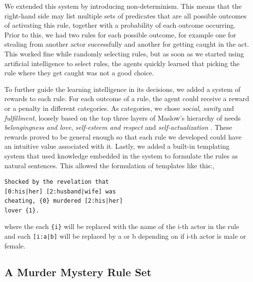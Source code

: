 We extended this system by introducing non-determinism. This means that the right-hand side may list multiple sets of predicates that are all possible outcomes of activating this rule, together with a probability of each outcome occurring. Prior to this, we had two rules for each possible outcome, for example one for stealing from another actor successfully and another for getting caught in the act. This worked fine while randomly selecting rules, but as soon as we started using artificial intelligence to select rules, the agents quickly learned that picking the rule where they get caught was not a good choice.

To further guide the learning intelligence in its decisions, we added a system of rewards to each rule. For each outcome of a rule, the agent could receive a reward or a penalty in different categories.
As categories, we chose \emph{social}, \emph{sanity} and \emph{fulfillment}, loosely based on the top three layers of Maslow's hierarchy of needs \emph{belongingness and love}, \emph{self-esteem and respect} and \emph{self-actualization} \cite{maslow_1943}.
These rewards proved to be general enough so that each rule we developed could have an intuitive value associated with it.
Lastly, we added a built-in templating system that used knowledge embedded in the system to formulate the rules as natural sentences.
This allowed the formulation of templates like this:,
\begin{lstlisting}
Shocked by the revelation that
[0:his|her] [2:husband|wife] was
cheating, {0} murdered [2:his|her]
lover {1}.
\end{lstlisting}
where the each \lstinline|{i}| will be replaced with the name of the i-th actor in the rule and each \lstinline{[i:a|b]} will be replaced by a or b depending on if i-th actor is male or female.

\subsection{A Murder Mystery Rule Set}

